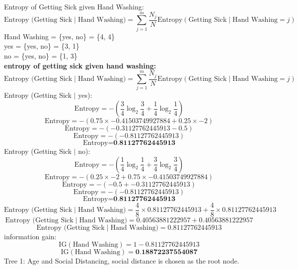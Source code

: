 \documentclass[a3paper,12pt]{extarticle} %
\begin{document}
\begin{enumerate}
\[        \]
        Entropy of Getting Sick given Hand Washing:
        \[
        \text{Entropy (Getting Sick} \mid \text{Hand Washing)} = \sum_{j=1}^m \frac{N_j}{N} \text{Entropy}(\text{Getting Sick} \mid \text{Hand Washing} = j)
        \]
        Hand Washing = \{yes, no\} = \{4, 4\}
        \\ yes = \{yes, no\} = \{3, 1\}
        \\ no = \{yes, no\} = \{1, 3\}
        \\ \textbf{entropy of getting sick given hand washing:}
        \[
        \text{Entropy (Getting Sick} \mid \text{Hand Washing)} = \sum_{j=1}^m \frac{N_j}{N} \text{Entropy}(\text{Getting Sick} \mid \text{Hand Washing} = j)
        \]
        Entropy (Getting Sick $\mid$ yes):
        \[
        \text{Entropy} = -\left(\frac{3}{4} \log_2 \frac{3}{4} + \frac{1}{4} \log_2 \frac{1}{4}\right)
        \]
        \[
        \text{Entropy} = -\left(0.75 \times -0.41503749927884 + 0.25 \times -2\right)
        \]
        \[
        \text{Entropy} = -\left(-0.31127762445913 - 0.5\right)
        \]
        \[
        \text{Entropy} = -\left(-0.81127762445913\right)
        \]
        \[
        \text{Entropy} = \textbf{0.81127762445913}
        \]
        Entropy (Getting Sick $\mid$ no):
        \[
        \text{Entropy} = -\left(\frac{1}{4} \log_2 \frac{1}{4} + \frac{3}{4} \log_2 \frac{3}{4}\right)
        \]
        \[
        \text{Entropy} = -\left(0.25 \times -2 + 0.75 \times -0.41503749927884\right)
        \]
        \[
        \text{Entropy} = -\left(-0.5 + -0.31127762445913\right)
        \]
        \[
        \text{Entropy} = -\left(-0.81127762445913\right)
        \]
        \[
        \text{Entropy} = \textbf{0.81127762445913}
        \]
        \[
        \text{Entropy (Getting Sick} \mid \text{Hand Washing)} = \frac{4}{8} \times 0.81127762445913 + \frac{4}{8} \times 0.81127762445913
        \]
        \[
        \text{Entropy (Getting Sick} \mid \text{Hand Washing)} = 0.40563881222957 + 0.40563881222957
        \]
        \[
        \text{Entropy (Getting Sick} \mid \text{Hand Washing)} = 0.81127762445913
        \]
        information gain:
        \[
        \text{IG}(\text{Hand Washing}) = 1 - 0.81127762445913
        \]
        \[
        \text{IG}(\text{Hand Washing}) = \textbf{0.18872237554087}
        \]
        Tree 1: Age and Social Distancing, social distance is chosen as the root node.\\
        \begin{tikzpicture}[
            level distance=1.5cm,
            level 1/.style={sibling distance=10cm},
            level 2/.style={sibling distance=7cm},
            level 3/.style={sibling distance=5cm},
            edge from parent/.style={draw, thick, -latex}
        ]


\end{tikzpicture}
\end{enumerate}
\end{document}
